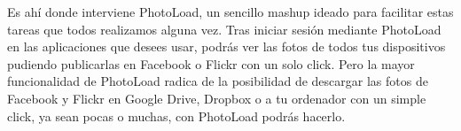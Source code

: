 \documentclass{scrartcl}
\begin{document}
Es ahí donde interviene PhotoLoad, un sencillo mashup ideado para facilitar estas tareas que todos realizamos alguna vez. Tras iniciar sesión mediante PhotoLoad en las aplicaciones que desees usar, podrás ver las fotos de todos tus dispositivos pudiendo publicarlas en Facebook o Flickr con un solo click. Pero la mayor funcionalidad de PhotoLoad radica de la posibilidad de descargar las fotos de Facebook y Flickr en Google Drive, Dropbox o a tu ordenador con un simple click, ya sean pocas o muchas, con PhotoLoad podrás hacerlo. 



\end{document}
